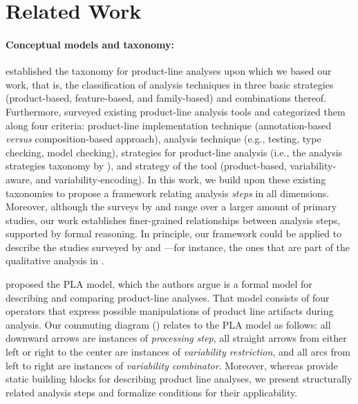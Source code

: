 \section{Related Work}
\label{sec:relatedWork}

\paragraph{Conceptual models and taxonomy:}
\citet{Thum2014} established the taxonomy for product-line analyses upon which we based our work, that is, the classification
of analysis techniques in three basic strategies (product-based, feature-based, and family-based) and combinations thereof.
Furthermore, \citet{AnalysisToolsSurvey} surveyed existing product-line analysis tools and categorized them along four criteria:
product-line implementation technique (annotation-based \textit{versus} composition-based approach),
analysis technique (e.g., testing, type checking, model checking),
strategies for product-line analysis (i.e., the analysis strategies taxonomy by \citet{Thum2014}),
and strategy of the tool (product-based, variability-aware, and variability-encoding).
In this work, we build upon these existing taxonomies to propose a framework relating
analysis \emph{steps} in all dimensions.
Moreover, although the surveys by \citet{Thum2014} and \citet{AnalysisToolsSurvey}
range over a larger amount of primary studies, our work establishes finer-grained
relationships between analysis steps, supported by formal reasoning.
In principle, our framework could be applied to describe the studies surveyed by
\citet{Thum2014} and \citet{AnalysisToolsSurvey}---for instance,
the ones that are part of the qualitative analysis in
.

\citet{PLAModel} proposed the PLA model, which the authors argue is a
formal model for describing and comparing product-line analyses.
That model consists of four operators that express possible manipulations
of product line artifacts during analysis.
Our commuting diagram  () relates  to the PLA model as follows:
all downward arrows are instances of \emph{processing step},
all straight arrows from either left or right to the center are instances of \emph{variability restriction}, and
all arcs from left to right are instances of \emph{variability combinator}.
Moreover, whereas \citet{PLAModel} provide static building blocks for
describing product line analyses, we present structurally related
analysis steps and formalize conditions for their applicability.

